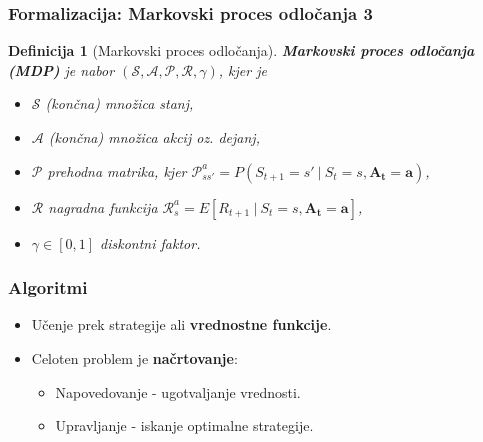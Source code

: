 \documentclass{beamer}    %
\newtheorem{definicija}[izrek]{Definicija}
\begin{document}
\begin{frame}
    \frametitle{Formalizacija: Markovski proces odločanja 3}
    \begin{definicija}[Markovski proces odločanja]
        \textbf{Markovski proces odločanja (MDP)} je nabor 
        $(\mathcal{S}, \mathcal{A}, \mathcal{P}, \mathcal{R}, \gamma)$, kjer je
        \begin{itemize}
            \item $\mathcal{S}$ (končna) množica stanj,
            \item $\mathcal{A}$ (končna) množica akcij oz. dejanj,
            \item $\mathcal{P}$ prehodna matrika, kjer $\mathcal{P}_{ss'}^a = P(S_{t+1} = s'~|~S_{t} = s,
                    \mathbf{A_t = a})$,
            \item $\mathcal{R}$ nagradna funkcija $\mathcal{R}_s^a = E[R_{t+1}~|~S_{t} = s, 
                    \mathbf{A_t = a}]$,
            \item $\gamma \in [0, 1]$ diskontni faktor.
        \end{itemize}
    \end{definicija}
\end{frame}


\begin{frame}
    \frametitle{Algoritmi}
    \begin{itemize}
        \item Učenje prek strategije ali \textbf{vrednostne funkcije}. 
        \item Celoten problem je \textbf{načrtovanje}:
        \begin{itemize}
            \item Napovedovanje - ugotvaljanje vrednosti.
            \item Upravljanje - iskanje optimalne strategije. 
        \end{itemize}
    \end{itemize}
\end{frame}
\end{document}

